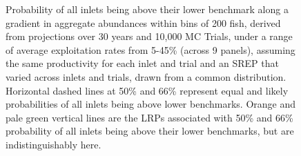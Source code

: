 \documentclass[11pt]{book}
\begin{document}
\begin{figure}[htb]

{\centering {} 

}

\caption{Probability of all inlets being above their lower benchmark along a gradient in aggregate abundances within bins of 200 fish, derived from projections over 30 years and 10,000 MC Trials, under a range of average exploitation rates from 5-45\% (across 9 panels), assuming the same productivity for each inlet and trial and an SREP that varied across inlets and trials, drawn from a common distribution. Horizontal dashed lines at 50\% and 66\% represent equal and likely probabilities of all inlets being above lower benchmarks. Orange and pale green vertical lines are the LRPs associated with 50\% and 66\% probability of all inlets being above their lower benchmarks, but are indistinguishably here. }\label{fig:chinook-ProjLRPs-SameProd}
\end{figure}
\linebreak
\end{document}
